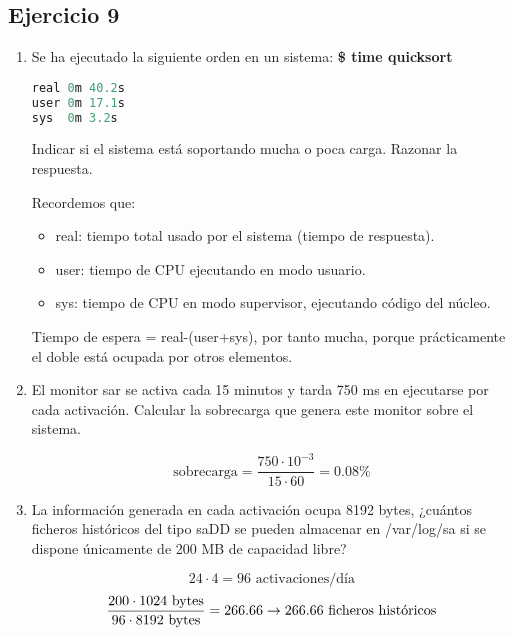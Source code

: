 \subsection{Ejercicio 9}
\begin{enumerate}
    \item Se ha ejecutado la siguiente orden en un sistema: \textbf{\$ time quicksort}
\begin{lstlisting}[language=C]
real 0m 40.2s
user 0m 17.1s
sys  0m 3.2s
\end{lstlisting}    
Indicar si el sistema está soportando mucha o poca carga. Razonar la respuesta.
\begin{tcolorbox}[colback=white,colframe=cyan!50!black,fonttitle=\bfseries]
Recordemos que:
\begin{itemize}
    \item real: tiempo total usado por el sistema (tiempo de respuesta).
    \item user: tiempo de CPU ejecutando en modo usuario.
    \item sys: tiempo de CPU en modo supervisor, ejecutando código del núcleo.
\end{itemize}
Tiempo de espera = real-(user+sys), por tanto mucha, porque prácticamente el doble está ocupada por otros elementos.
\end{tcolorbox}
\item El monitor sar se activa cada 15 minutos y tarda 750 ms en ejecutarse por cada activación. Calcular la sobrecarga que genera este monitor sobre el sistema.
\begin{tcolorbox}[colback=white,colframe=cyan!50!black,fonttitle=\bfseries]
\[
\text{sobrecarga}=\dfrac{750\cdot 10^{-3}}{15\cdot 60}=0.08\%
\]
\end{tcolorbox}
\item La información generada en cada activación ocupa 8192 bytes, ¿cuántos ficheros históricos del tipo saDD se pueden almacenar en /var/log/sa si se dispone únicamente de 200 MB de capacidad libre?
\begin{tcolorbox}[colback=white,colframe=cyan!50!black,fonttitle=\bfseries]
\[
24\cdot 4=96\text{ activaciones/día}
\]
\[
\dfrac{200\cdot 1024 \text{ bytes}}{96\cdot 8192\text{ bytes}}=266.66\rightarrow 266.66\text{ ficheros históricos}
\]
\end{tcolorbox}
\end{enumerate}
